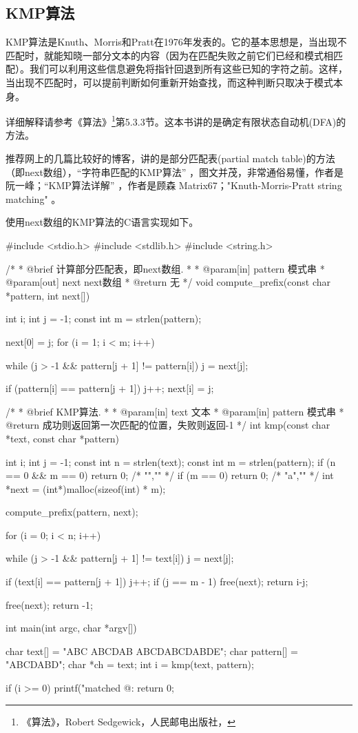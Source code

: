 \subsection{KMP算法}
KMP算法是Knuth、Morris和Pratt在1976年发表的。它的基本思想是，当出现不匹配时，就能知晓一部分文本的内容（因为在匹配失败之前它们已经和模式相匹配）。我们可以利用这些信息避免将指针回退到所有这些已知的字符之前。这样，当出现不匹配时，可以提前判断如何重新开始查找，而这种判断只取决于模式本身。

详细解释请参考《算法》\footnote{《算法》，Robert Sedgewick，人民邮电出版社，}第5.3.3节。这本书讲的是确定有限状态自动机(DFA)的方法。

推荐网上的几篇比较好的博客，讲的是部分匹配表(partial match table)的方法（即next数组），“字符串匹配的KMP算法” ，图文并茂，非常通俗易懂，作者是阮一峰；“KMP算法详解” ，作者是顾森 Matrix67；"Knuth-Morris-Pratt string matching" 。

使用next数组的KMP算法的C语言实现如下。
\begin{Codex}[label=kmp.c]
#include <stdio.h>
#include <stdlib.h>
#include <string.h>

/*
 * @brief 计算部分匹配表，即next数组.
 *
 * @param[in] pattern 模式串
 * @param[out] next next数组
 * @return 无
 */
void compute_prefix(const char *pattern, int next[]) {
    int i;
    int j = -1;
    const int m = strlen(pattern);

    next[0] = j;
    for (i = 1; i < m; i++) {
        while (j > -1 && pattern[j + 1] != pattern[i]) j = next[j];

        if (pattern[i] == pattern[j + 1]) j++;
        next[i] = j;
    }
}

/*
 * @brief KMP算法.
 *
 * @param[in] text 文本
 * @param[in] pattern 模式串
 * @return 成功则返回第一次匹配的位置，失败则返回-1
 */
int kmp(const char *text, const char *pattern) {
    int i;
    int j = -1;
    const int n = strlen(text);
    const int m = strlen(pattern);
    if (n == 0 && m == 0) return 0; /* "","" */
    if (m == 0) return 0;  /* "a","" */
    int *next = (int*)malloc(sizeof(int) * m);

    compute_prefix(pattern, next);

    for (i = 0; i < n; i++) {
        while (j > -1 && pattern[j + 1] != text[i]) j = next[j];

        if (text[i] == pattern[j + 1]) j++;
        if (j == m - 1) {
            free(next);
            return i-j;
        }
    }

    free(next);
    return -1;
}


int main(int argc, char *argv[]) {
    char text[] = "ABC ABCDAB ABCDABCDABDE";
    char pattern[] = "ABCDABD";
    char *ch = text;
    int i = kmp(text, pattern);

    if (i >= 0) printf("matched @: %
    return 0;
}
\end{Codex}


